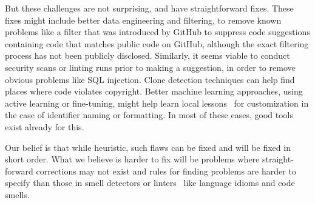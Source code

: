 But these challenges are not surprising, and have straightforward fixes. These fixes might include better data engineering and filtering, to remove known problems like a filter that was introduced by GitHub to suppress code suggestions containing code that matches public code on GitHub, although the exact filtering process has not been publicly disclosed.
Similarly, it seems viable to conduct security scans or linting runs prior to making a suggestion, in order to remove obvious problems like SQL injection. 
Clone detection techniques can help find places where code violates copyright. 
Better machine learning approaches, using active learning or fine-tuning, might help learn local lessons~\cite{Menzies2013} for customization in the case of identifier naming or formatting.
In most of these cases, good tools exist already for this. 

Our belief is that while heuristic, such flaws can be fixed and will be fixed in short order. 
What we believe is harder to fix will be problems where straight-forward corrections may not exist and rules for finding problems are harder to specify than those in smell detectors or linters~\cite{Ernst2017} like language idioms and code smells.
